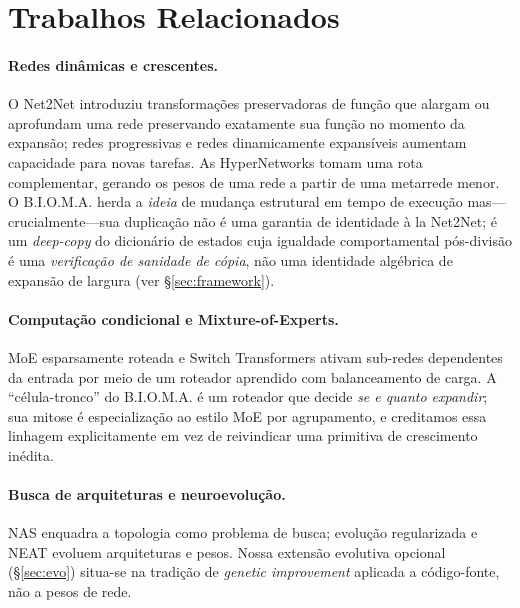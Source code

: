 \documentclass[11pt]{article}
\newcommand{\bioma}{\textsc{B.I.O.M.A.}}
\begin{document}
\section{Trabalhos Relacionados}
\paragraph{Redes dinâmicas e crescentes.}
O Net2Net \cite{chen2016net2net} introduziu transformações preservadoras de
função que alargam ou aprofundam uma rede preservando exatamente sua função no
momento da expansão; redes progressivas \cite{rusu2016progressive} e redes
dinamicamente expansíveis \cite{yoon2018den} aumentam capacidade para novas
tarefas. As HyperNetworks \cite{ha2017hypernetworks} tomam uma rota complementar,
gerando os pesos de uma rede a partir de uma metarrede menor. O \bioma{} herda a
\emph{ideia} de mudança estrutural em tempo de execução mas---crucialmente---sua
duplicação não é uma garantia de identidade à la Net2Net; é um \emph{deep-copy}
do dicionário de estados cuja igualdade comportamental pós-divisão é uma
\emph{verificação de sanidade de cópia}, não uma identidade algébrica de expansão
de largura (ver \S\ref{sec:framework}).

\paragraph{Computação condicional e Mixture-of-Experts.}
MoE esparsamente roteada \cite{shazeer2017moe} e Switch Transformers
\cite{fedus2022switch} ativam sub-redes dependentes da entrada por meio de um
roteador aprendido com balanceamento de carga. A ``célula-tronco'' do \bioma{} é
um roteador que decide \emph{se e quanto expandir}; sua mitose é especialização
ao estilo MoE por agrupamento, e creditamos essa linhagem explicitamente em vez
de reivindicar uma primitiva de crescimento inédita.

\paragraph{Busca de arquiteturas e neuroevolução.}
NAS \cite{zoph2017nas,elsken2019nas} enquadra a topologia como problema de busca;
evolução regularizada \cite{real2019amoeba} e NEAT
\cite{stanley2002neat,stanley2019neuroevolution} evoluem arquiteturas e pesos.
Nossa extensão evolutiva opcional (\S\ref{sec:evo}) situa-se na tradição de
\emph{genetic improvement} \cite{koza1992gp,petke2018gi,legoues2012genprog}
aplicada a código-fonte, não a pesos de rede.
\end{document}
